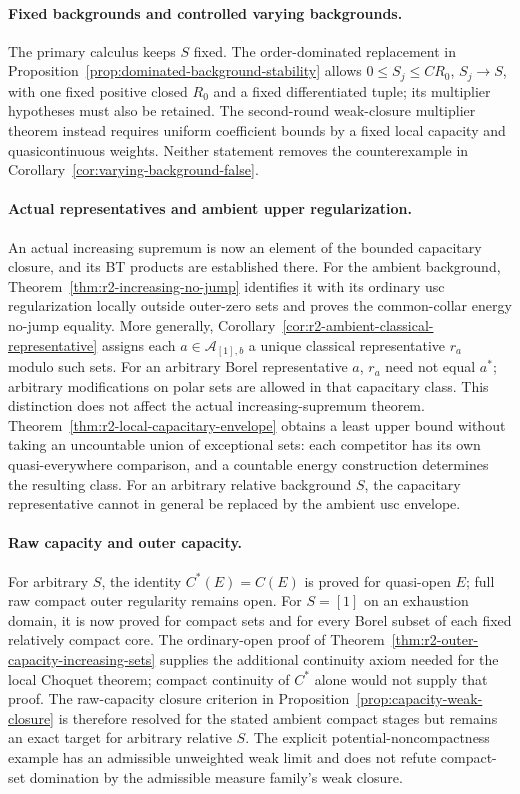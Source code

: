 \paragraph{Fixed backgrounds and controlled varying backgrounds.}
The primary calculus keeps $S$ fixed. The order-dominated replacement
in Proposition~\ref{prop:dominated-background-stability} allows
$0\leq S_j\leq C R_0$, $S_j\to S$, with one fixed positive closed
$R_0$ and a fixed differentiated tuple; its multiplier hypotheses
must also be retained. The second-round weak-closure multiplier
theorem instead requires uniform coefficient bounds by a fixed local
capacity and quasicontinuous weights. Neither statement removes the
counterexample in Corollary~\ref{cor:varying-background-false}.

\paragraph{Actual representatives and ambient upper regularization.}
An actual increasing supremum is now an element of the bounded
capacitary closure, and its BT products are established there. For the
ambient background, Theorem~\ref{thm:r2-increasing-no-jump} identifies
it with its ordinary usc regularization locally outside outer-zero
sets and proves the common-collar energy no-jump equality. More
generally, Corollary~\ref{cor:r2-ambient-classical-representative}
assigns each $a\in\mathcal A_{[1],b}$ a unique classical representative
$r_a$ modulo such sets. For an arbitrary Borel representative $a$,
$r_a$ need not equal $a^*$; arbitrary modifications on polar sets are
allowed in that capacitary class. This distinction does not affect
the actual increasing-supremum theorem.
Theorem~\ref{thm:r2-local-capacitary-envelope} obtains a least upper
bound without taking an uncountable union of exceptional sets: each
competitor has its own quasi-everywhere comparison, and a countable
energy construction determines the resulting class. For an arbitrary
relative background $S$, the capacitary representative cannot in
general be replaced by the ambient usc envelope.

\paragraph{Raw capacity and outer capacity.}
For arbitrary $S$, the identity $C^*(E)=C(E)$ is proved for quasi-open
$E$; full raw compact outer regularity remains open. For $S=[1]$ on
an exhaustion domain, it is now proved for compact sets and for
every Borel subset of each fixed relatively compact core. The
ordinary-open proof of Theorem~\ref{thm:r2-outer-capacity-increasing-sets}
supplies the additional continuity axiom needed for the local
Choquet theorem; compact continuity of $C^*$ alone would not supply
that proof. The raw-capacity closure criterion in
Proposition~\ref{prop:capacity-weak-closure} is therefore resolved
for the stated ambient compact stages but remains an exact target
for arbitrary relative $S$. The explicit potential-noncompactness
example has an admissible unweighted weak limit and does not refute
compact-set domination by the admissible measure family's weak closure.

